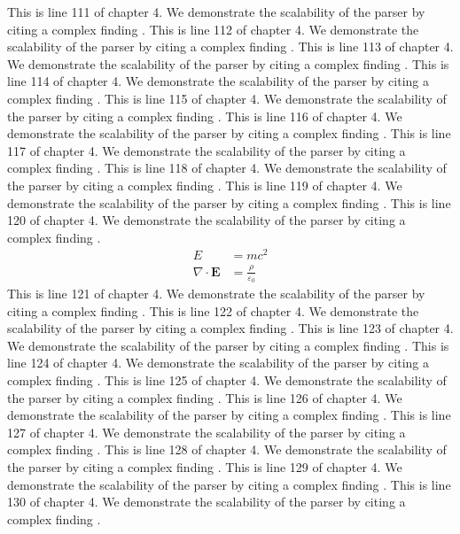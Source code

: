 This is line 111 of chapter 4. We demonstrate the scalability of the parser by citing a complex finding \cite{ref4_111}.
This is line 112 of chapter 4. We demonstrate the scalability of the parser by citing a complex finding \cite{ref4_112}.
This is line 113 of chapter 4. We demonstrate the scalability of the parser by citing a complex finding \cite{ref4_113}.
This is line 114 of chapter 4. We demonstrate the scalability of the parser by citing a complex finding \cite{ref4_114}.
This is line 115 of chapter 4. We demonstrate the scalability of the parser by citing a complex finding \cite{ref4_115}.
This is line 116 of chapter 4. We demonstrate the scalability of the parser by citing a complex finding \cite{ref4_116}.
This is line 117 of chapter 4. We demonstrate the scalability of the parser by citing a complex finding \cite{ref4_117}.
This is line 118 of chapter 4. We demonstrate the scalability of the parser by citing a complex finding \cite{ref4_118}.
This is line 119 of chapter 4. We demonstrate the scalability of the parser by citing a complex finding \cite{ref4_119}.
This is line 120 of chapter 4. We demonstrate the scalability of the parser by citing a complex finding \cite{ref4_120}.
\begin{align*}
  E &= mc^2 \\
  \nabla \cdot \mathbf{E} &= \frac{\rho}{\varepsilon_0}
\end{align*}
This is line 121 of chapter 4. We demonstrate the scalability of the parser by citing a complex finding \cite{ref4_121}.
This is line 122 of chapter 4. We demonstrate the scalability of the parser by citing a complex finding \cite{ref4_122}.
This is line 123 of chapter 4. We demonstrate the scalability of the parser by citing a complex finding \cite{ref4_123}.
This is line 124 of chapter 4. We demonstrate the scalability of the parser by citing a complex finding \cite{ref4_124}.
This is line 125 of chapter 4. We demonstrate the scalability of the parser by citing a complex finding \cite{ref4_125}.
This is line 126 of chapter 4. We demonstrate the scalability of the parser by citing a complex finding \cite{ref4_126}.
This is line 127 of chapter 4. We demonstrate the scalability of the parser by citing a complex finding \cite{ref4_127}.
This is line 128 of chapter 4. We demonstrate the scalability of the parser by citing a complex finding \cite{ref4_128}.
This is line 129 of chapter 4. We demonstrate the scalability of the parser by citing a complex finding \cite{ref4_129}.
This is line 130 of chapter 4. We demonstrate the scalability of the parser by citing a complex finding \cite{ref4_130}.
